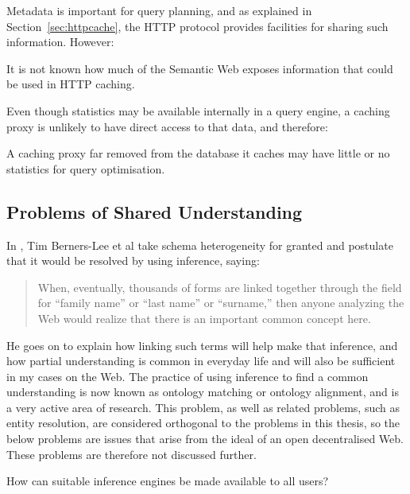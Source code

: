 Metadata is important for query planning, and as explained in
Section~\ref{sec:httpcache}, the HTTP protocol provides facilities for
sharing such information. However:
\begin{problem}\label{prob:sanity}
It is not known how much of the Semantic Web exposes information that
could be used in HTTP caching.
\end{problem}


Even though statistics may be available internally in a query engine,
a caching proxy is unlikely to have direct access to that data, and therefore:
\begin{problem}\label{prob:nostats}
A caching proxy far removed from the database it caches may have
little or no statistics for query optimisation.
\end{problem}


\subsection{Problems of Shared Understanding}\label{sec:semproblems}

In \cite{berners2000weaving}, Tim Berners-Lee et al take schema
heterogeneity for granted and postulate that it would be resolved by using
inference, saying:

\begin{quote}
When, eventually, thousands of forms are linked together through the
field for ``family name'' or ``last name'' or ``surname,'' then anyone
analyzing the Web would realize that there is an important common
concept here.
\end{quote}

He goes on to explain how linking such terms will help make
that inference, and how partial understanding is common in everyday
life and will also be sufficient in my cases on the Web. The practice
of using inference to find a common understanding is now known as
ontology matching or ontology alignment, and is a very active area of
research. This problem, as well as related problems, such as entity
resolution, are considered orthogonal to the problems in this thesis,
so the below problems are issues that arise from the ideal of an open
decentralised Web. These problems are therefore not discussed further.

\begin{problem}%
How can suitable inference engines be made available to all users?
\end{problem}


